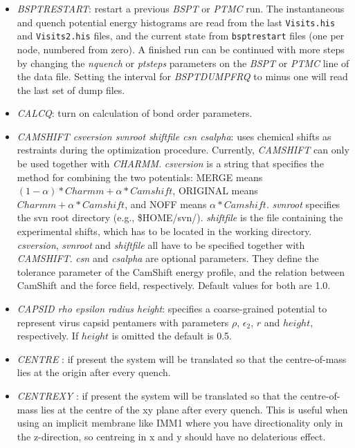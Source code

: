 \documentclass[12pt,a4paper,dvips]{article}
\begin{document}
\begin{itemize}
\item {\it BSPTRESTART\/}: restart a previous {\it BSPT\/} or {\it PTMC\/} run.
The instantaneous and quench potential energy histograms are read from the last
{\tt Visits.his} and {\tt Visits2.his} files, and the current state from 
{\tt bsptrestart} files (one per node, numbered from zero).
A finished run can be continued with more steps by changing the {\it nquench} 
or {\it ptsteps} parameters on the {\it BSPT\/} or {\it PTMC\/} line of
the data file. Setting the interval for {\it BSPTDUMPFRQ} to
minus one will read the last set of dump files.


\item {\it CALCQ\/}: turn on calculation of bond order parameters.

\item {\it CAMSHIFT csversion svnroot shiftfile csn csalpha\/}: uses chemical shifts as restraints during the 
optimization procedure. Currently, {\it CAMSHIFT} can only be used together with {\it CHARMM}. 
{\it csversion} is a string that specifies the method for combining the two potentials: MERGE means $(1-\alpha)*Charmm + \alpha*Camshift$, 
ORIGINAL means $Charmm + \alpha*Camshift$, and NOFF means $\alpha*Camshift$.
{\it svnroot} specifies the svn root directory (e.g., \$HOME/svn/). {\it shiftfile} is the file containing the 
experimental shifts, which has to be located in the working directory. {\it csversion}, {\it svnroot} and {\it shiftfile} all have to be
specified together with {\it CAMSHIFT}. {\it csn} and {\it csalpha} are optional parameters. They define the 
tolerance parameter of the CamShift energy profile, and the relation between CamShift and the force field, respectively.
Default values for both are 1.0. 

\item {\it CAPSID rho epsilon radius height\/}: specifies a coarse-grained potential to represent virus capsid pentamers
with parameters $\rho$, $\epsilon_2$, $r$ and $height$, respectively.
If $height$ is omitted the default is 0.5.

\item {\it CENTRE \/}: if present the system will be translated so that the centre-of-mass 
lies at the origin after every quench.

\item {\it CENTREXY \/}: if present the system will be translated so that the centre-of-mass 
lies at the centre of the xy plane after every quench. This is useful when using an implicit membrane like IMM1 where you have directionality only in the
z-direction, so centreing in x and y should have no delaterious effect.


\end{itemize}
\end{document}
